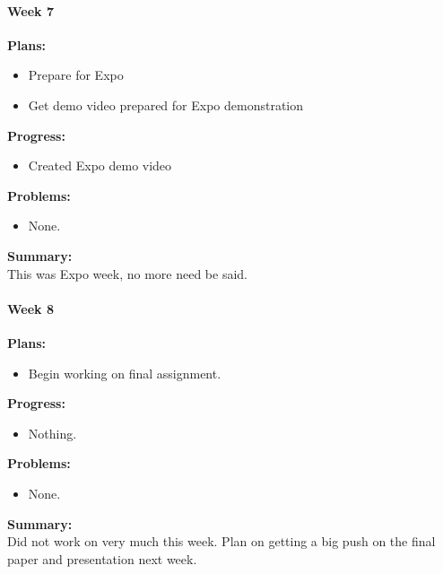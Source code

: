 \paragraph{Week 7}
\begin{adjustwidth}{2.5em}{0pt}
    \vspace{-0.5cm}\textbf{Plans:}
    \vspace{-0.5cm}
    \begin{itemize}
        \item Prepare for Expo
        \item Get demo video prepared for Expo demonstration
    \end{itemize} 
    \vspace{-0.3cm}\textbf{Progress:}
    \vspace{-0.5cm}
    \begin{itemize}
        \item 	Created Expo demo video
    \end{itemize} 
    \vspace{-0.3cm}\textbf{Problems:}
    \vspace{-0.5cm}
    \begin{itemize}
        \item None. 
    \end{itemize}  
    \vspace{-0.3cm}\noindent\textbf{Summary:}\\
    \noindent This was Expo week, no more need be said.
\end{adjustwidth} 
\paragraph{Week 8}
\begin{adjustwidth}{2.5em}{0pt}
    \vspace{-0.5cm}\textbf{Plans:}
    \vspace{-0.5cm}
    \begin{itemize}
        \item Begin working on final assignment. 
    \end{itemize} 
    \vspace{-0.3cm}\textbf{Progress:}
    \vspace{-0.5cm}
    \begin{itemize}
        \item Nothing.
    \end{itemize} 
    \vspace{-0.3cm}\textbf{Problems:}
    \vspace{-0.5cm}
    \begin{itemize}
        \item None.
    \end{itemize}  
    \vspace{-0.3cm}\noindent\textbf{Summary:}\\
    \noindent Did not work on very much this week. Plan on getting a big push on the final paper and presentation next week. 
\end{adjustwidth} 
